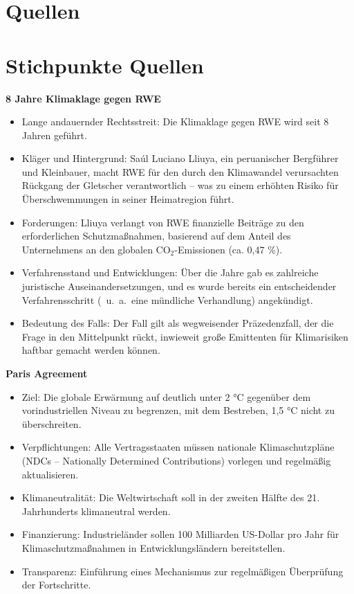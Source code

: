 \documentclass[a4paper, 12pt]{article} %
\begin{document}
\section{Quellen}

\clearpage

\section{Stichpunkte Quellen}

\textbf{\cite{8JahreKlimaklage} 8 Jahre Klimaklage gegen RWE}

 \begin{itemize}
   \item Lange andauernder Rechtsstreit: Die Klimaklage gegen RWE wird seit 8 Jahren geführt.
   \item Kläger und Hintergrund: Saúl Luciano Lliuya, ein peruanischer Bergführer und Kleinbauer, macht RWE für den durch den Klimawandel verursachten Rückgang der Gletscher verantwortlich – was zu einem erhöhten Risiko für Überschwemmungen in seiner Heimatregion führt.
   \item Forderungen: Lliuya verlangt von RWE finanzielle Beiträge zu den erforderlichen Schutzmaßnahmen, basierend auf dem Anteil des Unternehmens an den globalen CO$_2$-Emissionen (ca. 0,47 \%).
   \item Verfahrensstand und Entwicklungen: Über die Jahre gab es zahlreiche juristische Auseinandersetzungen, und es wurde bereits ein entscheidender Verfahrensschritt (\ u.\ a.\ eine mündliche Verhandlung) angekündigt.
   \item Bedeutung des Falls: Der Fall gilt als wegweisender Präzedenzfall, der die Frage in den Mittelpunkt rückt, inwieweit große Emittenten für Klimarisiken haftbar gemacht werden können.
 \end{itemize}

 \textbf{\cite{agreement2015paris} Paris Agreement}

 \begin{itemize}
    \item Ziel: Die globale Erwärmung auf deutlich unter 2 °C gegenüber dem vorindustriellen Niveau zu begrenzen, mit dem Bestreben, 1,5 °C nicht zu überschreiten.
    \item Verpflichtungen: Alle Vertragsstaaten müssen nationale Klimaschutzpläne (NDCs – Nationally Determined Contributions) vorlegen und regelmäßig aktualisieren.
    \item Klimaneutralität: Die Weltwirtschaft soll in der zweiten Hälfte des 21. Jahrhunderts klimaneutral werden.
    \item Finanzierung: Industrieländer sollen 100 Milliarden US-Dollar pro Jahr für Klimaschutzmaßnahmen in Entwicklungsländern bereitstellen.
    \item Transparenz: Einführung eines Mechanismus zur regelmäßigen Überprüfung der Fortschritte.
 \end{itemize}
\end{document}
